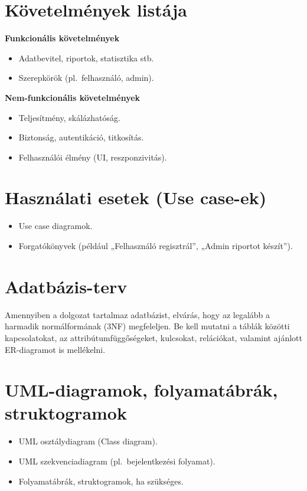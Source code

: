 \documentclass{thesis-ekf}
\begin{document}
\section{Követelmények listája}
\textbf{Funkcionális követelmények}
\begin{itemize}
  \item Adatbevitel, riportok, statisztika stb.
  \item Szerepkörök (pl.\ felhasználó, admin).
\end{itemize}
\textbf{Nem-funkcionális követelmények}
\begin{itemize}
  \item Teljesítmény, skálázhatóság.
  \item Biztonság, autentikáció, titkosítás.
  \item Felhasználói élmény (UI, reszponzivitás).
\end{itemize}

\section{Használati esetek (Use case-ek)}
\begin{itemize}
  \item Use case diagramok.
  \item Forgatókönyvek (például „Felhasználó regisztrál'', „Admin riportot készít'').
\end{itemize}

\section{Adatbázis-terv}
Amennyiben a dolgozat tartalmaz adatbázist, elvárás, hogy az legalább a harmadik normálformának (3NF) megfeleljen. Be kell mutatni a táblák közötti kapcsolatokat, az attribútumfüggőségeket, kulcsokat, relációkat, valamint ajánlott ER-diagramot is mellékelni.

\section{UML-diagramok, folyamatábrák, struktogramok}
\begin{itemize}
  \item UML osztálydiagram (Class diagram).
  \item UML szekvenciadiagram (pl.\ bejelentkezési folyamat).
  \item Folyamatábrák, struktogramok, ha szükséges.
\end{itemize}
\end{document}
